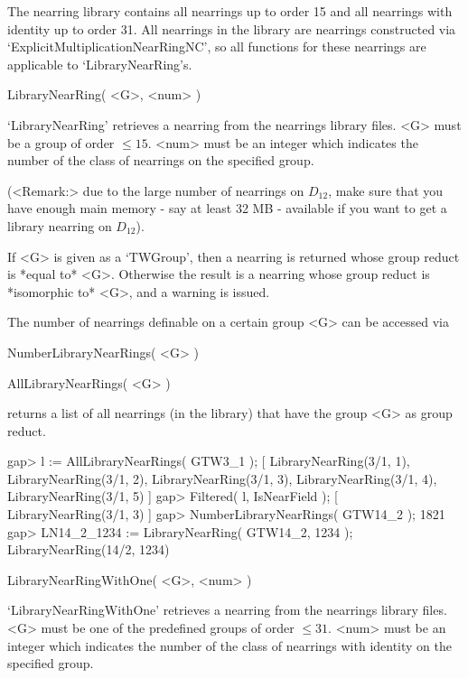 %
%

The nearring library contains all nearrings up to order 15 and all
nearrings with identity up to order 31. All nearrings in the library are
nearrings constructed via `ExplicitMultiplicationNearRingNC', so all functions
for these nearrings are applicable to `LibraryNearRing's.



\>LibraryNearRing( <G>, <num> )

`LibraryNearRing' retrieves a nearring from the nearrings library files. 
<G> must be a group of order $\le 15$. <num> must be an integer which 
indicates the number of the class of nearrings on the specified group. 

(<Remark:> due to the large number of nearrings on $D_{12}$, make sure 
that you have enough main memory - say at least 32 MB - available if you want 
to get a library nearring on $D_{12}$).

If <G> is given as a `TWGroup', then a nearring is returned whose group reduct
is *equal to* <G>. Otherwise the result is a nearring whose group reduct is 
*isomorphic to* <G>, and a warning is issued.
 
The number of nearrings definable on a certain group <G> can be accessed via

\>NumberLibraryNearRings( <G> )

\>AllLibraryNearRings( <G> )

returns a list of all nearrings (in the library) that have the group <G> as
group reduct.

\beginexample
    gap> l := AllLibraryNearRings( GTW3_1 );
    [ LibraryNearRing(3/1, 1), LibraryNearRing(3/1, 2), 
      LibraryNearRing(3/1, 3), LibraryNearRing(3/1, 4), 
      LibraryNearRing(3/1, 5) ]
    gap> Filtered( l, IsNearField );
    [ LibraryNearRing(3/1, 3) ]
    gap> NumberLibraryNearRings( GTW14_2 );
    1821
    gap> LN14_2_1234 := LibraryNearRing( GTW14_2, 1234 );
    LibraryNearRing(14/2, 1234)
\endexample
 
\>LibraryNearRingWithOne( <G>, <num> )

`LibraryNearRingWithOne' retrieves a nearring from the nearrings library
files. 
<G> must be one of the predefined groups of order $\le 31$.  
<num> must be an integer which indicates the number of the class of 
nearrings with identity on the specified group. 

